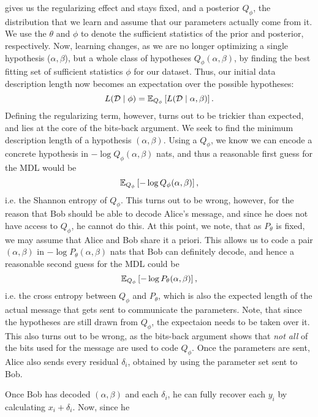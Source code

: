 gives us the regularizing effect and stays fixed, and a posterior $Q_\phi$, the
distribution that we learn and assume that our parameters actually come
from it. We use the $\theta$ and $\phi$ to denote the sufficient
statistics of the prior and posterior, respectively. Now, learning changes, as
we are no longer optimizing a single hypothesis ($\alpha, \beta$), but a whole
class of hypotheses $Q_\phi(\alpha, \beta)$, by finding the best fitting set
of sufficient statistics $\phi$ for our dataset. Thus, our initial data
description length now becomes an expectation over the possible hypotheses:
\[
  L(\Data \mid \phi) = \Exp{L(\Data \mid \alpha, \beta)}{Q_\phi}.
\]
Defining the regularizing term, however, turns out to be trickier than expected,
and lies at the core of the bits-back argument. We seek to find the minimum
description length of a hypothesis $(\alpha, \beta)$. Using a $Q_\phi$, we know
we can encode a concrete hypothesis in $-\log Q_\phi (\alpha, \beta)$ nats, and thus a
reasonable first guess for the MDL would be
\begin{equation}
\label{eq:hypothesis_entropy}
  \Exp{-\log Q_\phi(\alpha, \beta)}{Q_\phi},
\end{equation}
i.e. the Shannon entropy of $Q_\phi$.
This turns out to be wrong, however, for the reason that Bob should be able to
decode Alice's message, and since he does not have access to $Q_\phi$, he cannot
do this. 
At this point, we note, that as $P_\theta$ is fixed, we may assume that Alice
and Bob share it a priori. This allows us to code a pair $(\alpha, \beta)$ in
$-\log P_\theta(\alpha, \beta)$ nats that Bob can definitely decode, and hence a
reasonable second guess for the MDL could be
\begin{equation}
\label{eq:hypothesis_cross_entropy}
\Exp{-\log P_\theta(\alpha, \beta)}{Q_\phi},
\end{equation}
i.e. the cross entropy between $Q_\phi$ and $P_\theta$, which is also the
expected length of the actual message that gets sent to communicate the
parameters. Note, that since the hypotheses are still drawn from $Q_\phi$,
the expectaion needs to be taken over it. This also turns out to be wrong,
as the bits-back argument shows that \textit{not all} of the bits used for
the message are used to code $Q_\phi$. Once the parameters are sent, Alice also
sends every residual $\delta_i$, obtained by using the parameter set sent to Bob.
\par
Once Bob has decoded $(\alpha, \beta)$ and each $\delta_i$,
he can fully recover each $y_i$ by calculating $x_i + \delta_i$. Now, since he
